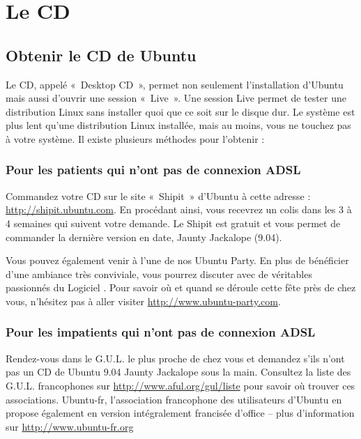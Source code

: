 \section{Le CD}
\subsection{Obtenir le CD de Ubuntu}
Le CD, appelé «~Desktop CD~», permet non seulement l'installation d'Ubuntu mais aussi d'ouvrir une session «~Live~». Une session Live permet de tester une distribution Linux sans installer quoi que ce soit sur le disque dur. Le système est plus lent qu'une distribution Linux installée, mais au moins, vous ne touchez pas à votre système. Il existe plusieurs méthodes pour l'obtenir :
\subsubsection{Pour les patients qui n'ont pas de connexion ADSL}
Commandez votre CD sur le site «~Shipit~» d'Ubuntu à cette adresse : \url{http://shipit.ubuntu.com}. En procédant ainsi, vous recevrez un colis dans les 3 à 4 semaines qui suivent votre demande. Le Shipit est gratuit et vous permet de commander %
 la dernière version en date, Jaunty Jackalope (9.04).\par
Vous pouvez également venir à l'une de nos Ubuntu Party. En plus de bénéficier d'une ambiance très conviviale, vous pourrez discuter avec de véritables passionnés du Logiciel . Pour savoir où et quand se déroule cette fête près de chez vous, n'hésitez pas à aller visiter \url{http://www.ubuntu-party.com}.
\subsubsection{Pour les impatients qui n'ont pas de connexion ADSL}
Rendez-vous dans le G.U.L. le plus proche de chez vous et demandez s'ils n'ont pas un CD de Ubuntu 9.04 Jaunty Jackalope sous la main. Consultez la liste des G.U.L. francophones sur \url{http://www.aful.org/gul/liste} pour savoir où trouver ces associations. Ubuntu-fr, l'association francophone des utilisateurs d'Ubuntu en propose également en version intégralement francisée d'office -- plus d'information sur \url{http://www.ubuntu-fr.org}
